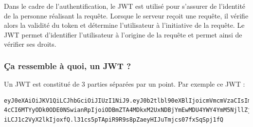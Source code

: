 Dans le cadre de l’authentification, le JWT est utilisé pour s’assurer de l’identité de la personne réalisant la requête. Lorsque le serveur reçoit une requête, il vérifie alors la validité du token et détermine l’utilisateur à l’initiative de la requête. Le JWT permet d’identifier l’{\color{monOrange}utilisateur} à l’origine de la requête et permet ainsi de {\color{monOrange}vérifier ses droits}.

\subsubsection*{Ça ressemble à quoi, un JWT ?}
Un JWT est constitué de 3 parties séparées par un point. Par exemple ce JWT : 

\begin{verbatim}
eyJ0eXAiOiJKV1QiLCJhbGciOiJIUzI1NiJ9.eyJ0b2tlbl90eXBlIjoicmVmcmVzaCIsImV
4cCI6MTYyODk0ODE0NSwianRpIjoiODBmZTA4MDkxM2UxNDBjYmEwMDU4YWY4YmM5NjllZjY
iLCJ1c2VyX2lkIjoxfQ.l31cs5pTApiR9R9s8pZaeyHIJuTmjcs07fxSqSpj1fQ
\end{verbatim} 


